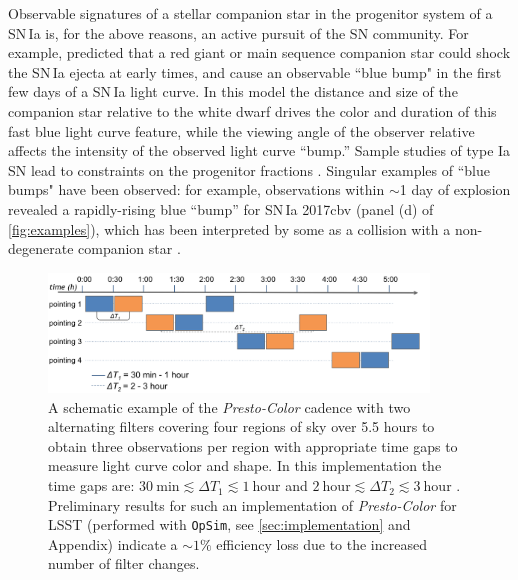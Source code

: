 \documentclass[letterpaper,longauthor,trackchanges,twocolumn,onecolappendix,sort&compress]{aastex62}
\newcommand{\dtone}{\ensuremath{\Delta T_1}}
\newcommand{\dttwo}{\ensuremath{\Delta T_2}}
\begin{document}
Observable signatures of a stellar companion star in the progenitor system of a SN\,Ia is, for the above reasons, an active pursuit of the SN community. For example, \citet{Kasen2010} predicted that a red giant or main sequence companion star could shock the SN\,Ia ejecta at early times, and cause an observable ``blue bump" in the first few days of a SN\,Ia light curve. In this model the distance and size of the companion star relative to the white dwarf drives the color and duration of this fast blue light curve feature, while the viewing angle of the observer relative affects the intensity of the observed light curve ``bump.'' Sample studies of type Ia SN lead to constraints on the progenitor fractions \citep{Bianco11, Hayden2010}. Singular examples of ``blue bumps" have been observed: for example, observations within $\sim$1 day of explosion revealed a rapidly-rising blue ``bump'' for SN\,Ia 2017cbv (panel (d) of \autoref{fig:examples}), which has been interpreted by some as a collision with a non-degenerate companion star \citep{Hosseinzadeh2017}.

\begin{figure}[!t]
\begin{center}
\includegraphics[width=0.9\textwidth]{figures/cadence_highlevel.png}
\caption{A schematic example of the {\em Presto-Color} cadence with two alternating filters covering four regions of sky over 5.5 hours to obtain three observations per region with appropriate time gaps to measure light curve color and shape. In this implementation the time gaps are: $\mathrm{30~min} \lesssim \dtone\lesssim \mathrm{1~hour}$ and $\mathrm{2~hour} \lesssim \dttwo\lesssim \mathrm{3~hour}$ . Preliminary results for such an implementation of {\em Presto-Color} for LSST (performed with {\tt OpSim}, see \autoref{sec:implementation} and Appendix) indicate a $\sim1\%$ efficiency loss due to the increased number of filter changes.}\label{fig:implementation}
\end{center}
\end{figure}
\end{document}
